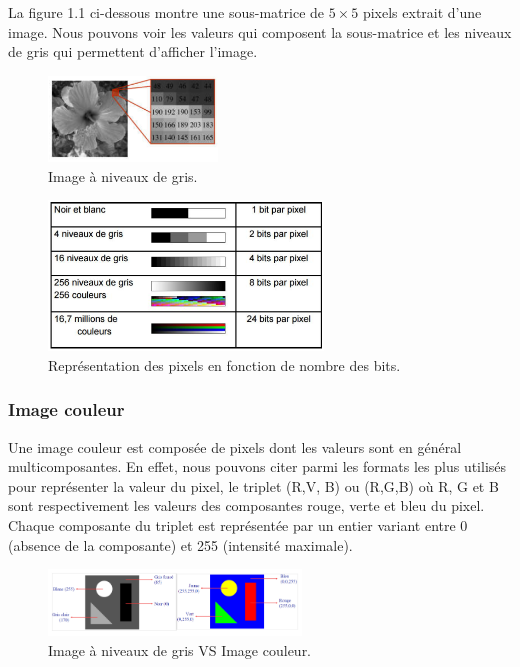 La figure 1.1 ci-dessous montre une sous-matrice de $5 \times 5$ pixels extrait d’une image. Nous pouvons voir les valeurs qui composent la sous-matrice et les niveaux de gris qui permettent d’afficher l'image.

\begin{figure}[H]
	\centering
	\includegraphics[width=0.4\textwidth]{Figures/gray} 
	\caption{Image à niveaux de gris.}
\end{figure}

\begin{figure}[H]
	\label{fig:tableRVB}
	\centering
	\includegraphics[width=0.65\textwidth]{Figures/tableRVB} %
	
	\caption{Représentation des pixels en fonction de nombre des bits.}
	
\end{figure}
\subsubsection{Image couleur}
Une image couleur est composée de pixels dont les valeurs sont en général multicomposantes. En effet, nous pouvons citer parmi les formats les plus utilisés pour représenter la valeur du pixel, le triplet (R,V, B) ou (R,G,B) où R, G et B sont respectivement les valeurs des composantes rouge, verte et bleu du pixel. Chaque composante du triplet est représentée par un entier variant entre 0
(absence de la composante) et 255 (intensité maximale). 

\begin{figure}[H]
	\centering
	\includegraphics[width=0.6\textwidth]{Figures/grayvscol} 
	\caption{Image à niveaux de gris VS Image couleur.}
\end{figure}

